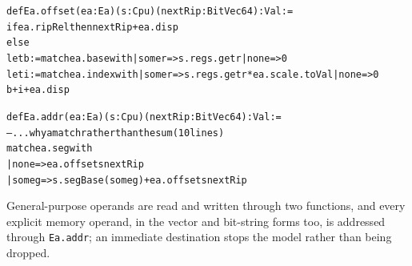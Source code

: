 \documentclass[runningheads]{llncs}
\newcommand{\src}[1]{}  %
\newcommand{\lean}[1]{\texttt{#1}}
\begin{document}
{\scriptsize
\begin{alltt}
def Ea.offset (ea : Ea) (s : Cpu) (nextRip : BitVec 64) : Val :=
  if ea.ripRel then nextRip + ea.disp
  else
    let b := match ea.base with | some r => s.regs.get r | none => 0
    let i := match ea.index with | some r => s.regs.get r * ea.scale.toVal | none => 0
    b + i + ea.disp

def Ea.addr (ea : Ea) (s : Cpu) (nextRip : BitVec 64) : Val :=
  -- ... why a match rather than the sum (10 lines)
  match ea.seg with
  | none => ea.offset s nextRip
  | some g => s.segBase (some g) + ea.offset s nextRip
\end{alltt}
}

General-purpose operands are read and written through two functions, and every explicit memory operand, in the vector and bit-string forms too, is addressed through \lean{Ea.addr}; an immediate destination stops the model rather than being dropped.
\src{X86/Semantics.lean readOperand, writeOperand; the .vload/.vstore/.vbinm arms (ea.addr), bitStringByte}
\end{document}
